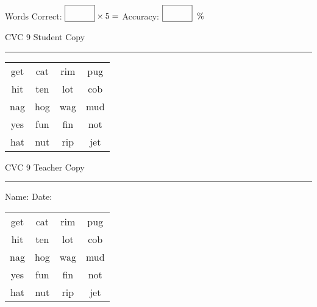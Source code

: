 \documentclass{memoir}
\begin{document}
\normalsize

Words Correct: $\fbox{\phantom{\huge 100}} \times 5 = $ Accuracy: $\fbox{\phantom{\huge 100}}\;\; \%$ 

\vfill

\newpage


\footnotesize \noindent
CVC 9 \hfill Student Copy
\smallskip
\hrule

\huge

\setlength{\tabcolsep}{14pt}
\def\arraystretch{2}

{\selectfont


\begin{vplace}[0.5]
\begin{center}
\begin{tabular}{cccc}
get & cat & rim & pug \\
hit & ten & lot & cob \\
nag & hog & wag & mud \\
yes & fun & fin & not \\
hat & nut & rip & jet \\
\end{tabular}
\end{center}
\end{vplace}

}

\newpage

\footnotesize \noindent
CVC 9 \hfill Teacher Copy
\smallskip
\hrule

\normalsize

\vfill

\noindent
Name: \underline{\hspace{1.75in}} \hfill Date: \underline{\hspace{1in}}

\huge

{\selectfont


\begin{vplace}[0.5]
\begin{center}
\begin{tabular}{cccc}
get & cat & rim & pug \\
hit & ten & lot & cob \\
nag & hog & wag & mud \\
yes & fun & fin & not \\
hat & nut & rip & jet \\
\end{tabular}
\end{center}
\end{vplace}



}
\end{document}
